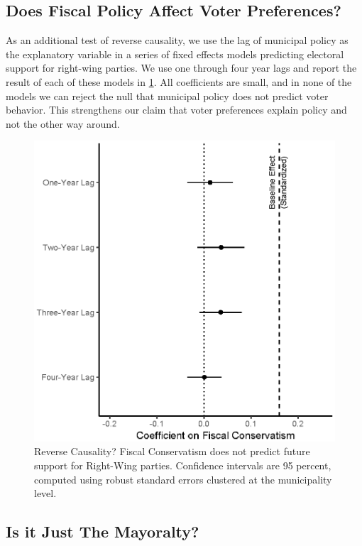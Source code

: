 \documentclass[a4paper,12pt]{article}
\begin{document}
\subsection{Does Fiscal Policy Affect Voter Preferences?}\label{granger}

As an additional test of reverse causality, we use the lag of municipal policy as the explanatory variable in a series of fixed effects models predicting electoral support for right-wing parties. We use one through four year lags and report the result of each of these models in  \ref{fig:granger}. All coefficients are small, and in none of the models we can  reject the null that municipal policy does not predict voter behavior. This strengthens our claim that voter preferences explain policy and not the other way around.


\begin{figure}[!htb]
	\centering
	\includegraphics[scale = 1]{granger_18092018.eps}
	\caption{Reverse Causality? Fiscal Conservatism does not predict future support for Right-Wing parties. Confidence intervals are 95 percent, computed using robust standard errors clustered at the municipality level.} \label{fig:granger}
\end{figure}
\clearpage
\subsection{Is it Just The Mayoralty?}\label{mechanism}
\end{document}
